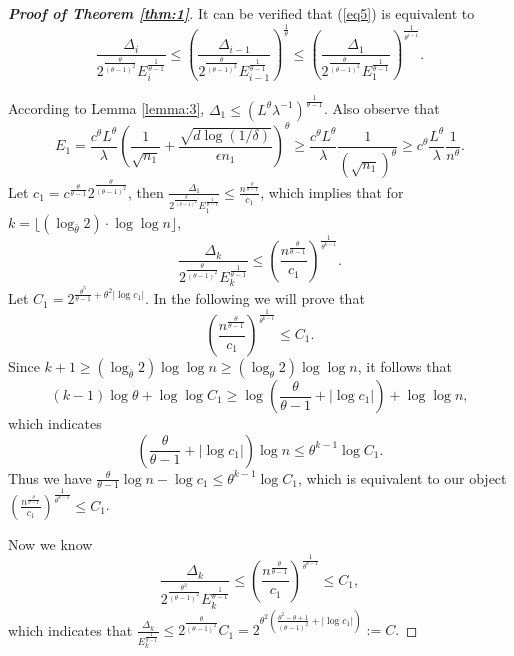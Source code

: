\documentclass[12pt]{alt2022} %
\begin{document}
\begin{proof}[{\bf Proof of Theorem \ref{thm:1}}]
		
		
		It can be verified that (\ref{eq5}) is equivalent to  \begin{equation*}
		\frac{\Delta_{i}}{2^{\frac{\theta}{(\theta-1)^2}}E_{i}^{\frac{1}{\theta-1}}}\leq\left(\frac{\Delta_{i-1}}{2^{\frac{\theta}{(\theta-1)^2}}E_{i-1}^{\frac{1}{\theta-1}}}\right)^{\frac{1}{\theta}}\leq \left(\frac{\Delta_1}{2^{\frac{\theta}{(\theta-1)^2}}E_1^{\frac{1}{\theta-1}}}\right)^{\frac{1}{\theta^{i-1}}}.
		\end{equation*}
		
		
		According to Lemma \ref{lemma:3}, $\Delta_1\leq (L^{\theta}\lambda^{-1})^{\frac{1}{\theta-1}}$. Also observe that $$E_1=\frac{c^{\theta}L^{\theta}}{\lambda}(\frac{1}{\sqrt{n_1}}+\frac{\sqrt{d\log(1/\delta)}}{\epsilon n_1})^{\theta}\geq \frac{c^{\theta}L^{\theta}}{\lambda}\frac{1}{(\sqrt{n_1})^{\theta}}\geq c^{\theta }\frac{L^{\theta}}{\lambda} \frac{1}{n^{\theta}}.$$ Let $c_1=c^{\frac{\theta}{\theta -1}}2^{\frac{\theta}{(\theta-1)^2}}$, then $ \frac{\Delta_1}{2^{\frac{\theta}{(\theta-1)^2}}E_1^{\frac{1}{\theta-1}}}\leq  \frac{n^{\frac{\theta}{\theta-1}} }{c_1 }$,
		which implies that for $k=\lfloor (\log_{\bar{\theta}}2)\cdot \log\log n\rfloor$, 
		\begin{equation*}
		\frac{\Delta_{k}}{2^{\frac{\theta}{(\theta-1)^2}}E_{k}^{\frac{1}{\theta-1}}}\leq  \left(\frac{n^{\frac{\theta}{\theta-1}} }{c_1}\right)^{\frac{1}{\theta^{k-1}}}.
		\end{equation*}
		Let $C_1=2^{\frac{\theta^3}{\theta -1}+\theta^2|\log c_1|}$. In the following we will prove that  $$\left(\frac{n^{\frac{\theta}{\theta-1}} }{c_1}\right)^{\frac{1}{\theta^{k-1}}}\leq C_1.$$
		Since $k+1\geq( \log_{\bar{\theta}} 2)\log\log n\geq ( \log_{\theta} 2)\log\log n$, it follows that
		$$(k-1)\log \theta +\log\log C_1\geq \log(\frac{\theta}{\theta-1}+|\log c_1|)+\log\log n,$$ which indicates $$(\frac{\theta}{\theta-1}+|\log c_1|)\log n\leq \theta^{k-1}\log C_1.$$ Thus we have $\frac{\theta}{\theta-1}\log n-\log c_1\leq \theta^{k-1}\log C_1$, which is equivalent to our object $\left(\frac{n^{\frac{\theta}{\theta-1}} }{c_1}\right)^{\frac{1}{\theta^{k-1}}}\leq C_1$.
		
		Now we know 
		\begin{equation*}
		\frac{\Delta_{k}}{2^{\frac{\theta^2}{(\theta-1)^2}}E_{k}^{\frac{1}{\theta-1}}}\leq  \left(\frac{n^{\frac{\theta}{\theta-1}} }{c_1}\right)^{\frac{1}{\theta^{k-1}}}\leq C_1,
		\end{equation*}
		which indicates that $\frac{\Delta_k}{E_{k}^{\frac{1}{\theta-1}}}\leq 2^{\frac{\theta}{(\theta-1)^2}} C_1=2^{\theta^2(\frac{\theta^2-\theta+1}{(\theta-1)^2}+|\log c_1|)}:=C.$
		

\end{proof}
\end{document}
